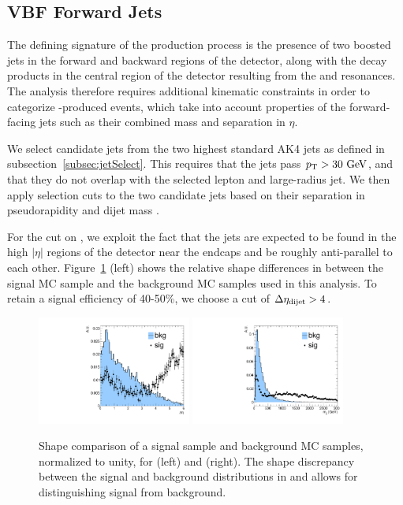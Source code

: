 \subsection{VBF Forward Jets}
\label{subsec:VBFjets}

The defining signature of the \VBF production process is the presence of two boosted jets in the forward and backward regions of the detector, along with the decay products in the central region of the detector resulting from the \Wlep and \Vhad resonances.
The analysis therefore requires additional kinematic constraints in order to categorize \VBF-produced events, which take into account properties of the forward-facing \VBF jets such as their combined mass and separation in $\eta$.

We select candidate \VBF jets from the two highest \pt standard AK4 jets as defined in subsection~\ref{subsec:jetSelect}.
This requires that the \VBF jets pass $\pt>30\unit{GeV}$, and that they do not overlap with the selected lepton and large-radius jet.
We then apply selection cuts to the two candidate \VBF jets based on their separation in pseudorapidity \DetaVBF and \VBF dijet mass \mjjVBF.

For the cut on \DetaVBF, we exploit the fact that the \VBF jets are expected to be found in the high $|\eta|$ regions of the detector near the endcaps and be roughly anti-parallel to each other.
Figure~\ref{fig:detaSB_VBF} (left) shows the relative shape differences in \DetaVBF between the \VBF\RadtoWW signal MC sample and the background MC samples used in this analysis.
To retain a signal efficiency of 40-50\%, we choose a cut of $\DetaVBF>4$.

\begin{figure}[htbp]
  \centering
  \includegraphics[width=0.45\textwidth]{fig/analysis/detaSB.pdf}
  \includegraphics[width=0.45\textwidth]{fig/analysis/mjjSB.pdf}\\
  \caption{
    Shape comparison of a \VBF\RadtoWW signal sample and background MC samples, normalized to unity, for \DetaVBF (left) and \mjjVBF (right).
    The shape discrepancy between the \VBF signal and background distributions in \DetaVBF and \mjjVBF allows for distinguishing signal from background.
  }
  \label{fig:detaSB_VBF}
\end{figure}

